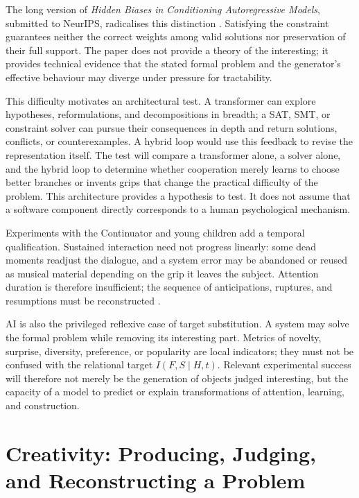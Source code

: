 \documentclass[11pt,a4paper]{article}
\begin{document}
The long version of \emph{Hidden Biases in Conditioning Autoregressive Models},
submitted to NeurIPS, radicalises this distinction
\parencite{pachet2026biases}. Satisfying the constraint guarantees neither the
correct weights among valid solutions nor preservation of their full support.
The paper does not provide a theory of the interesting; it provides technical
evidence that the stated formal problem and the generator's effective behaviour
may diverge under pressure for tractability.

This difficulty motivates an architectural test. A transformer can explore
hypotheses, reformulations, and decompositions in breadth; a SAT, SMT, or
constraint solver can pursue their consequences in depth and return solutions,
conflicts, or counterexamples. A hybrid loop would use this feedback to revise
the representation itself. The test will compare a transformer alone, a solver
alone, and the hybrid loop to determine whether cooperation merely learns to
choose better branches or invents grips that change the practical difficulty of
the problem. This architecture provides a hypothesis to test. It does not assume
that a software component directly corresponds to a human psychological mechanism.

Experiments with the Continuator and young children add a temporal qualification.
Sustained interaction need not progress linearly: some dead moments readjust the
dialogue, and a system error may be abandoned or reused as musical material depending
on the grip it leaves the subject. Attention duration is therefore insufficient; the
sequence of anticipations, ruptures, and resumptions must be reconstructed
\parencite{addessi2005experiments,addessi2006flowmachine}.

AI is also the privileged reflexive case of target substitution. A
system may solve the formal problem while removing its interesting part.
Metrics of novelty, surprise, diversity, preference, or popularity are local
indicators; they must not be confused with the relational target
\(I(F,S\mid H,t)\). Relevant experimental success will therefore not merely be
the generation of objects judged interesting, but the capacity of a model to
predict or explain transformations of attention, learning, and construction.

\section{Creativity: Producing, Judging, and Reconstructing a Problem}
\end{document}

